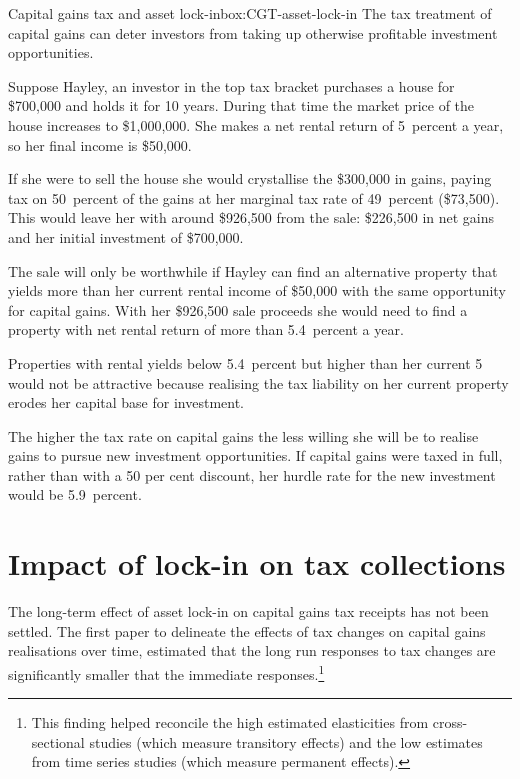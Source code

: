 \begin{subappendices}
\begin{smallbox}[!hp]{Capital gains tax and asset lock-in}{box:CGT-asset-lock-in}
The tax treatment of capital gains can deter investors from taking up otherwise profitable investment opportunities. 



Suppose Hayley, an investor in the top tax bracket purchases a house for \$700,000 and holds it for 10 years. During that time the market price of the house increases to \$1,000,000. She makes a net rental return of 5~percent a year, so her  final income is \$50,000. 

If she were to sell the house she would crystallise the \$300,000 in gains, paying tax on 50~percent of the gains at her marginal tax rate of 49~percent (\$73,500). This would leave her with around \$926,500 from the sale: \$226,500 in net gains and her initial investment of \$700,000. 

The sale will only be worthwhile if Hayley can find an alternative property that yields more than her current rental income of \$50,000  with the same opportunity for capital gains. With her \$926,500 sale proceeds she would need to find a property with net rental return of more than 5.4~percent a year. 

Properties with rental yields below 5.4~percent but higher than her current 5 would not be attractive because realising the tax liability on her current property erodes her capital base for investment.  

The higher the tax rate on capital gains the less willing she will be to realise gains to pursue new investment opportunities. If capital gains were taxed in full, rather than with a 50 per cent discount, her hurdle rate for the new investment would be 5.9~percent.
\end{smallbox}
\clearpage

\section{Impact of lock-in on tax collections}

The long-term effect of asset lock-in on capital gains tax receipts has not been settled. The first paper to delineate the effects of tax changes on capital gains realisations over time, estimated that the long run responses to tax changes are significantly smaller that the immediate responses.\footnote{\textcite{BurmanRandolph1994} This finding helped reconcile the high estimated elasticities from cross-sectional studies (which measure transitory effects) and the low estimates from time series studies (which measure permanent effects).} 


\end{subappendices}
